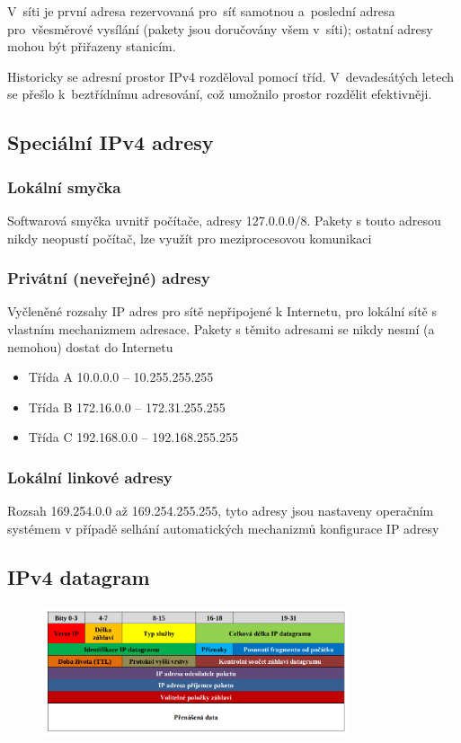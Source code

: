 V~síti je první adresa rezervovaná pro~síť samotnou a~poslední adresa pro~všesměrové vysílání (pakety jsou doručovány všem v~síti); ostatní adresy mohou být přiřazeny stanicím.

Historicky se adresní prostor IPv4 rozděloval pomocí tříd. V~devadesátých letech se přešlo k~beztřídnímu adresování, což umožnilo prostor rozdělit efektivněji.

\subsection{Speciální IPv4 adresy}
\subsubsection{Lokální smyčka}
Softwarová smyčka uvnitř počítače, adresy 127.0.0.0/8. Pakety s touto adresou nikdy neopustí počítač, lze využít pro meziprocesovou komunikaci

\subsubsection{Privátní (neveřejné) adresy}
Vyčleněné rozsahy IP adres pro sítě nepřipojené k Internetu, pro lokální sítě s vlastním mechanizmem adresace. Pakety s těmito adresami se nikdy nesmí (a nemohou) dostat do Internetu
\begin{itemize}
    \item Třída A 10.0.0.0 – 10.255.255.255
    \item Třída B 172.16.0.0 – 172.31.255.255
    \item Třída C 192.168.0.0 – 192.168.255.255
\end{itemize}

\subsubsection{Lokální linkové adresy}
Rozsah 169.254.0.0 až 169.254.255.255, tyto adresy jsou nastaveny operačním systémem v případě selhání automatických mechanizmů konfigurace IP adresy

\subsection{IPv4 datagram}

\begin{figure}[!h]
    \centering
    \includegraphics[width=0.8\textwidth]{obrazky/020.png}
\end{figure}

